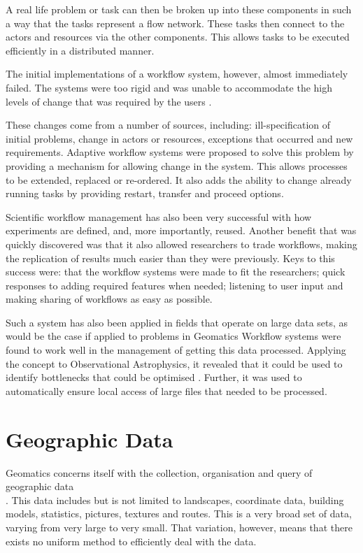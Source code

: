 A real life problem or task can then be broken up into these components in
such a way that the tasks represent a flow network. These tasks then connect to
the actors and resources via the other
components\cite[p.~4]{Taylor:2006:WES:1196459}.  This allows tasks to be
executed efficiently in a distributed manner.

The initial implementations of a workflow system, however, almost
immediately failed. The systems were too rigid and was unable to accommodate the
high levels of change that was required by the users
\cite{Suchman:1983:OPP:357442.357445}.

These changes come from a number of sources, including: ill-specification
of initial problems, change in actors or resources, exceptions that occurred
and new requirements.  Adaptive workflow systems were proposed to solve this
problem by providing a mechanism for allowing change in the
system\cite{vanderAalst2002125}. This allows processes to be extended, replaced
or re-ordered. It also adds the ability to change already running tasks by
providing restart, transfer and proceed options.

Scientific workflow management has also been very successful with how
experiments are defined, and, more importantly, reused. Another benefit that was
quickly discovered was that it also allowed researchers to trade workflows,
making the replication of results much easier than they were
previously\cite{4721191}. Keys to this success were: that the workflow systems
were made to fit the researchers; quick responses to adding required features
when needed; listening to user input and making sharing of workflows as easy as
possible.

Such a system has also been applied in fields that operate on large data
sets, as would be the case if applied to problems in Geomatics  Workflow systems were found to
work well in the management of getting this data processed. Applying the
concept to Observational Astrophysics, it revealed that it could be used to
identify bottlenecks that could be optimised \cite{Aragon:2009:WMH:1529282.1529491}.  Further, it was used to
automatically ensure local access of large files that needed to be processed.


\section{Geographic Data}
Geomatics concerns itself with the collection, organisation and query of
geographic data \\  \cite{DiMartino:2007:TAG:1341012.1341081}.  This data includes
but  is not limited to landscapes, coordinate data, building models,
statistics, pictures, textures and routes. This is a very broad set of data,
varying from very large to very small.  That variation, however, means that
there exists no uniform method to efficiently deal with the data.

